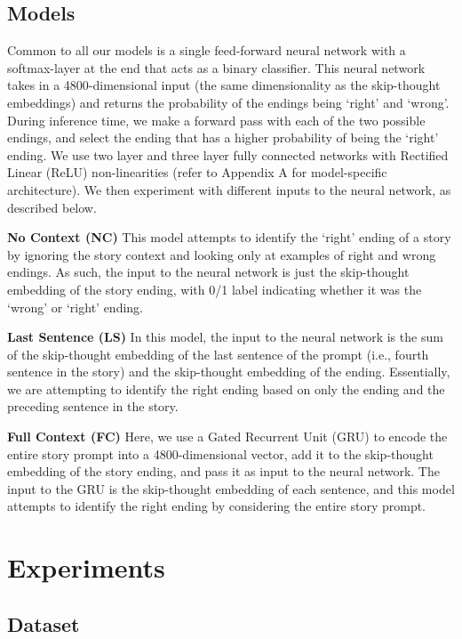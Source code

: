 \documentclass[11pt,a4paper]{article}
\begin{document}
\subsection{Models}

Common to all our models is a single feed-forward neural network with a softmax-layer at the end that acts as a binary classifier. This neural network takes in a 4800-dimensional input (the same dimensionality as the skip-thought embeddings) and returns the probability of the endings being `right' and `wrong'. During inference time, we make a forward pass with each of the two possible endings, and select the ending that has a higher probability of being the `right' ending. We use two layer and three layer fully connected networks with Rectified Linear (ReLU) non-linearities (refer to Appendix A for model-specific architecture). We then experiment with different inputs to the neural network, as described below.

{\bf No Context (NC)} 
This model attempts to identify the `right' ending of a story by ignoring the story context and looking only at examples of right and wrong endings. As such, the input to the neural network is just the skip-thought embedding of the story ending, with 0/1 label indicating whether it was the `wrong' or `right' ending.

{\bf Last Sentence (LS)} 
In this model, the input to the neural network is the sum of the skip-thought embedding of the last sentence of the prompt (i.e., fourth sentence in the story) and the skip-thought embedding of the ending. Essentially, we are attempting to identify the right ending based on only the ending and the preceding sentence in the story.

{\bf Full Context (FC)} Here, we use a Gated Recurrent Unit (GRU) to encode the entire story prompt into a 4800-dimensional vector, add it to the skip-thought embedding of the story ending, and pass it as input to the neural network. The input to the GRU is the skip-thought embedding of each sentence, and this model attempts to identify the right ending by considering the entire story prompt.

\section{Experiments}
\label{sect:pdf}

\subsection{Dataset}
\end{document}
